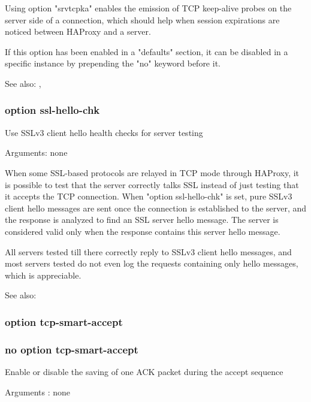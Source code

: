   Using option "srvtcpka" enables the emission of TCP keep-alive probes on the
  server side of a connection, which should help when session expirations are
  noticed between HAProxy and a server.

  If this option has been enabled in a "defaults" section, it can be disabled
  in a specific instance by prepending the "no" keyword before it.

  See also: , 

\subsubsection{option ssl-hello-chk}


  Use SSLv3 client hello health checks for server testing


  Arguments: none

  When some SSL-based protocols are relayed in TCP mode through HAProxy, it is
  possible to test that the server correctly talks SSL instead of just testing
  that it accepts the TCP connection. When "option ssl-hello-chk" is set, pure
  SSLv3 client hello messages are sent once the connection is established to
  the server, and the response is analyzed to find an SSL server hello message.
  The server is considered valid only when the response contains this server
  hello message.

  All servers tested till there correctly reply to SSLv3 client hello messages,
  and most servers tested do not even log the requests containing only hello
  messages, which is appreciable.

  See also: 

\subsubsection{option tcp-smart-accept}
\subsubsection{no option tcp-smart-accept}


  Enable or disable the saving of one ACK packet during the accept sequence


  Arguments : none

